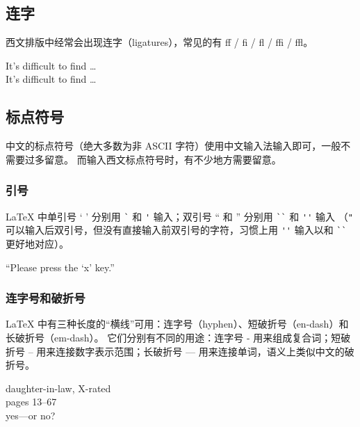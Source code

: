 \subsection{连字}\label{subsec:ligatures}

西文排版中经常会出现连字（ligatures），常见的有 ff / fi / fl / ffi / ffl{}。
\begin{example}
It's difficult to find \ldots\\
It's dif{}f{}icult to f{}ind \ldots
\end{example}

\subsection{标点符号}\label{subsec:punct}

中文的标点符号（绝大多数为非 ASCII 字符）使用中文输入法输入即可，一般不需要过多留意。
而输入西文标点符号时，有不少地方需要留意。

\subsubsection{引号}

\LaTeX{} 中单引号 ` ' 分别用 \verb|`| 和 \verb|'| 输入；双引号 `` 和 '' 分别用 \verb|``| 和 \verb|''| 输入
（\verb|"| 可以输入后双引号，但没有直接输入前双引号的字符，习惯上用 \verb|''| 输入以和 \verb|``| 更好地对应）。
\begin{example}
``Please press the `x' key.''
\end{example}

\subsubsection{连字号和破折号}

\LaTeX{} 中有三种长度的“横线”可用：连字号（hyphen）、短破折号（en-dash）和长破折号（em-dash）。
它们分别有不同的用途：连字号 - 用来组成复合词；短破折号 -- 用来连接数字表示范围；长破折号 --- 用来连接单词，语义上类似中文的破折号。
\begin{example}
daughter-in-law, X-rated\\
pages 13--67\\
yes---or no?
\end{example}

